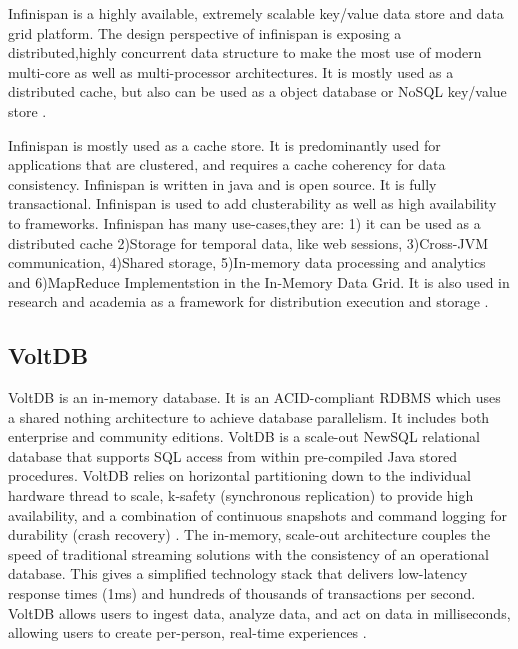      Infinispan is a highly available, extremely scalable key/value data
     store and data grid platform. The design perspective of
     infinispan is exposing a distributed,highly concurrent data
     structure to make the most use of modern multi-core as well as
     multi-processor architectures. It is mostly used as a distributed
     cache, but also can be used as a object database or NoSQL
     key/value store \cite{infinispan.org}.

     Infinispan is mostly used as a cache store. It is predominantly
     used for applications that are clustered, and requires a cache
     coherency for data consistency. Infinispan is written in java and
     is open source. It is fully transactional. Infinispan is used to
     add clusterability as well as high availability to frameworks.
     Infinispan has many use-cases,they are: 1) it can be used as a
     distributed cache 2)Storage for temporal data, like web sessions,
     3)Cross-JVM communication, 4)Shared storage, 5)In-memory data
     processing and analytics and 6)MapReduce Implementstion in the
     In-Memory Data Grid. It is also used in research and academia as
     a framework for distribution execution and
     storage \cite{infinispan_wikipedia}.
     
\subsection{ VoltDB}

     VoltDB is an in-memory database. It is an ACID-compliant RDBMS
     which uses a shared nothing architecture to achieve database
     parallelism. It includes both enterprise and community
     editions. VoltDB is a scale-out NewSQL relational database that
     supports SQL access from within pre-compiled Java stored
     procedures.  VoltDB relies on horizontal partitioning down to the
     individual hardware thread to scale, k-safety (synchronous
     replication) to provide high availability, and a combination of
     continuous snapshots and command logging for durability (crash
     recovery) \cite{www-voltdb}. The in-memory, scale-out
     architecture couples the speed of traditional streaming solutions
     with the consistency of an operational database. This gives a
     simplified technology stack that delivers low-latency response
     times (1ms) and hundreds of thousands of transactions per
     second. VoltDB allows users to ingest data, analyze data, and act
     on data in milliseconds, allowing users to create per-person,
     real-time experiences \cite{www-voltdb}.

